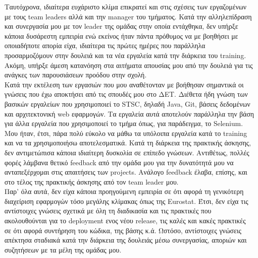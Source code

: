 Ταυτόχρονα, ιδιαίτερα ευχάριστο κλίμα επικρατεί και στις σχέσεις των εργαζομένων με τους team leaders αλλά και την manager του τμήματος. Κατά την αλληλεπίδραση και συνεργασία μου με τον leader της 
ομάδας στην οποία εντάχθηκα, δεν υπήρξε κάποια δυσάρεστη εμπειρία ενώ εκείνος ήταν πάντα πρόθυμος να με βοηθήσει με οποιαδήποτε απορία είχα, ιδιαίτερα τις πρώτες ημέρες που παράλληλα προσαρμοζόμουν 
στην δουλειά και τα νέα εργαλεία κατά την διάρκεια του training. Ακόμη, υπήρξε άμεση κατανόηση στα αιτήματα απουσίας μου από την δουλειά για τις ανάγκες των παρουσιάσεων προόδου στην σχολή.\\

Κατά την εκτέλεση των εργασιών που μου αναθέτονταν με βοήθησαν σημαντικά οι γνώσεις που έχω αποκτήσει από τις σπουδές μου στο ΔΕΤ. Διέθετα ήδη γνώση των βασικών εργαλείων που χρησιμοποιεί το STSC, δηλαδή 
Java, Git, βάσεις δεδομένων και αρχιτεκτονική web εφαρμογών. Τα εργαλεία αυτά αποτελούν παράλληλα την βάση για άλλα εργαλεία που χρησιμοποιεί το τμήμα όπως, για παράδειγμα, το Selenium. Μου ήταν, έτσι, πάρα πολύ 
εύκολο να μάθω τα υπόλοιπα εργαλεία κατά το training και να τα χρησιμοποιήσω αποτελεσματικά. Κατά τη διάρκεια της πρακτικής άσκησης, δεν αντιμετώπισα κάποια ιδιαίτερη δυσκολία σε επίπεδο γνώσεων. Αντιθέτως, πολλές 
φορές λάμβανα θετικό feedback από την ομάδα μου για την δυνατότητά μου να ανταπεξέρχομαι στις απαιτήσεις των projects. Ανάλογο feedback έλαβα, επίσης, και στο τέλος της πρακτικής άσκησης από τον team leader μου.\\

Παρ' όλα αυτά, δεν είχα κάποια προηγούμενη εμπειρία σε ότι αφορά τη γενικότερη διαχείριση εφαρμογών τόσο μεγάλης κλίμακας όπως της Eurostat. Έτσι, δεν είχα τις αντίστοιχες γνώσεις σχετικά με όλη τη 
διαδικασία και τις πρακτικές που ακολουθούνται για το deployment ενος νέου release, τις καλές και κακές πρακτικές σε ότι αφορά συντήρηση του κώδικα, της βάσης κ.ά. Ωστόσο, αντίστοιχες γνώσεις 
απέκτησα σταδιακά κατά την διάρκεια της δουλειάς μέσω συνεργασίας, αποριών και συζητήσεων με τα μέλη της ομάδας μου.

